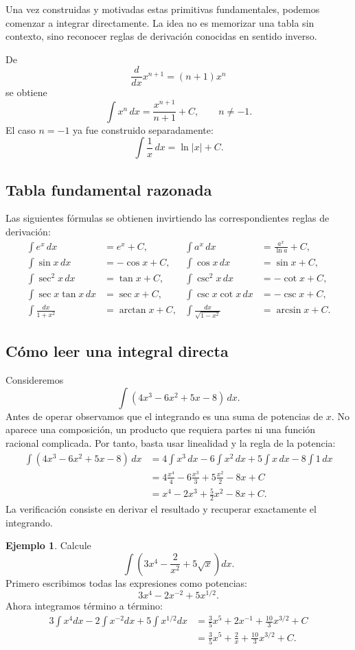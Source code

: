 \documentclass[12pt]{article}
\theoremstyle{definition}
\newtheorem{ejemplo}[teorema]{Ejemplo}
\theoremstyle{remark}
\begin{document}
Una vez construidas y motivadas estas primitivas fundamentales, podemos comenzar a integrar directamente. La idea no es memorizar una tabla sin contexto, sino reconocer reglas de derivación conocidas en sentido inverso.

De
\[
\frac{d}{dx}x^{n+1}=(n+1)x^n
\]
se obtiene
\[
\boxed{\int x^n\,dx=\frac{x^{n+1}}{n+1}+C,\qquad n\neq-1.}
\]
El caso $n=-1$ ya fue construido separadamente:
\[
\boxed{\int\frac1x\,dx=\ln|x|+C.}
\]
\subsection*{Tabla fundamental razonada}
Las siguientes fórmulas se obtienen invirtiendo las correspondientes reglas de derivación:
\begin{align*}
\int e^x\,dx&=e^x+C,&
\int a^x\,dx&=\frac{a^x}{\ln a}+C,\\
\int\sin x\,dx&=-\cos x+C,&
\int\cos x\,dx&=\sin x+C,\\
\int\sec^2x\,dx&=\tan x+C,&
\int\csc^2x\,dx&=-\cot x+C,\\
\int\sec x\tan x\,dx&=\sec x+C,&
\int\csc x\cot x\,dx&=-\csc x+C,\\
\int\frac{dx}{1+x^2}&=\arctan x+C,&
\int\frac{dx}{\sqrt{1-x^2}}&=\arcsin x+C.
\end{align*}
\subsection*{Cómo leer una integral directa}
Consideremos
\[
\int(4x^3-6x^2+5x-8)\,dx.
\]
Antes de operar observamos que el integrando es una suma de potencias de $x$. No aparece una composición, un producto que requiera partes ni una función racional complicada. Por tanto, basta usar linealidad y la regla de la potencia:
\begin{align*}
\int(4x^3-6x^2+5x-8)\,dx
&=4\int x^3\,dx-6\int x^2\,dx+5\int x\,dx-8\int1\,dx\\
&=4\frac{x^4}{4}-6\frac{x^3}{3}+5\frac{x^2}{2}-8x+C\\
&=\boxed{x^4-2x^3+\frac52x^2-8x+C}.
\end{align*}
La verificación consiste en derivar el resultado y recuperar exactamente el integrando.

\begin{ejemplo}
Calcule
\[
\int\left(3x^4-\frac2{x^2}+5\sqrt{x}\right)dx.
\]
Primero escribimos todas las expresiones como potencias:
\[
3x^4-2x^{-2}+5x^{1/2}.
\]
Ahora integramos término a término:
\begin{align*}
3\int x^4dx-2\int x^{-2}dx+5\int x^{1/2}dx
&=\frac35x^5+2x^{-1}+\frac{10}{3}x^{3/2}+C\\
&=\boxed{\frac35x^5+\frac2x+\frac{10}{3}x^{3/2}+C}.
\end{align*}
\end{ejemplo}
\end{document}
